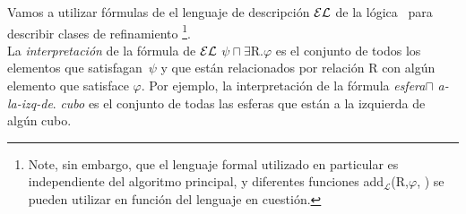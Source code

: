 Vamos a utilizar f\'ormulas de el lenguaje de descripci\'on $\mathcal{EL}$ de la l\'ogica~\cite{baad:desc03} para describir clases de refinamiento \footnote {Note, sin embargo, que el lenguaje formal utilizado en particular es independiente del algoritmo principal, y diferentes funciones add$_{\mathcal {L}}$(R,$\varphi $, \RE) se pueden utilizar en funci\'on del lenguaje en cuesti\'on.}.\\
La {\it interpretaci\'on} de la f\'ormula de $\mathcal{EL}$  $\psi \sqcap \exists $R.$ \varphi$ es el conjunto de todos los elementos que satisfagan~$\psi$ y que est\'an relacionados por relaci\'on R con alg\'un elemento que satisface $\varphi $.
Por ejemplo, la interpretaci\'on de la f\'ormula \emph{esfera}$\sqcap$ \emph{a-la-izq-de}. \emph{cubo} es el conjunto de todas las esferas que est\'an a la izquierda de alg\'un cubo.\\


